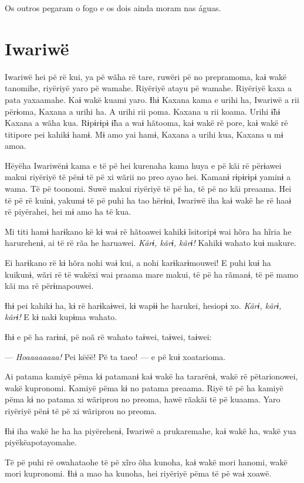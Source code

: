 Os outros pegaram o fogo e os dois ainda moram nas águas.

\chapter{Iwariwë}

 Iwariwë hei pë rë kui, ya pë wãha rë tare, ruwëri pë no prepramoma,
kaɨ wakë tanomihe, riyëriyë yaro pë wamahe. Riyëriyë atayu pë wamahe.
Riyëriyë kaxa a pata yaxaamahe. Kaɨ wakë kuami yaro. Ɨhɨ Kaxana kama e
urihi ha, Iwariwë a rii përɨoma, Kaxana a urihi ha. A urihi rii poma.
Kaxana u rii koama. Urihi ɨ̃hɨ Kaxana a wãha kua. Rɨpɨrɨpɨ ɨ̃ha a waɨ
hãtooma, kaɨ wakë rë pore, kaɨ wakë rë titipore pei kahikɨ hamɨ. Mɨ amo
yai hamɨ, Kaxana a urihi kua, Kaxana u mɨ amoa. 

Hëyëha Iwariwënɨ kama e të pë hei kurenaha kama huya e pë kãi rë
përɨawei makui riyëriyë të pënɨ të pë xi wãrii no preo ayao hei. Kamanɨ
rɨpɨrɨpɨ yaminɨ a wama. Të pë toonomi. Suwë makui riyëriyë të pë ha, të
pë no kãi preaama. Hei të pë rë kuinɨ, yakumɨ të pë puhi ha tao hërɨnɨ,
Iwariwë iha kaɨ wakë he rë haaɨ rë piyërahei, hei mɨ amo ha të kua. 

Mi titi hamɨ harɨkano kë kɨ waɨ rë hãtoawei kahikɨ ĩsitoripɨ wai hõra ha
hĩria he harurehenɨ, ai të rë rãa he haruawei. \textit{Kãrɨ, kãrɨ, kãrɨ!} Kahikɨ
wahato kuɨ makure. 

Ei harɨkano rë kɨ hõra nohi waɨ kui, a nohi karɨkarɨmouwei! E puhi kuɨ
ha kuikunɨ, wãri rë të wakëxi wai praama mare makui, të pë ha rãmanɨ, të
pë mamo kãi ma rë përɨmapouwei. 

Ɨhɨ pei kahikɨ ha, kɨ rë harɨkaɨwei, kɨ wapɨɨ he harukei, hesiopɨ xo.
\textit{Kãrɨ, kãrɨ, kãrɨ!} E kɨ nakɨ kupɨma wahato. 

Ɨhɨ e pë ha rarɨnɨ, pë noã rë wahato taɨwei, taɨwei, taɨwei: 

--- \textit{Hoaaaaaaaa!} Pei këëë! Pë ta taeo! --- e pë kuɨ xoatarioma. 

Ai patama kamiyë pëma kɨ patamanɨ kaɨ wakë ha tararënɨ, wakë rë
pëtarionowei, wakë kupronomi. Kamiyë pëma kɨ no patama preaama. Riyë të
pë ha kamiyë pëma kɨ no patama xi wãriprou no preoma, hawë rãakãi të pë
kuaama. Yaro riyëriyë pënɨ të pë xi wãriprou no preoma. 

Ɨhɨ iha wakë he ha ha piyërehenɨ, Iwariwë a prukaremahe, kaɨ wakë ha,
wakë yua piyëkëapotayomahe. 

Të pë puhi rë owahataohe të pë xĩro õha kunoha, kaɨ wakë mori hanomi,
wakë mori kupronomi. Ɨhɨ a mao ha kunoha, hei riyëriyë pëma të pë waɨ
xoawë. 

